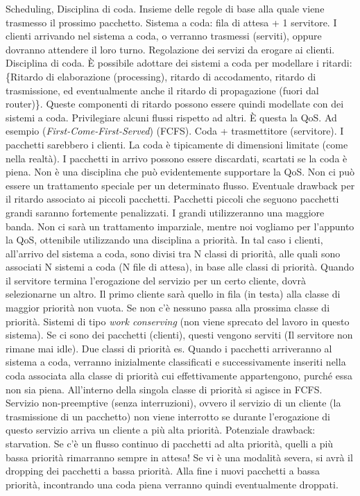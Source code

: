 Scheduling, Disciplina di coda. Insieme delle regole di base alla quale viene trasmesso il prossimo pacchetto. Sistema a coda: fila di attesa + 1 servitore. I clienti arrivando nel sistema a coda, o verranno trasmessi (serviti), oppure dovranno attendere il loro turno. Regolazione dei servizi da erogare ai clienti. Disciplina di coda. \`E possibile adottare dei sistemi a coda per modellare i ritardi: \{Ritardo di elaborazione (processing), ritardo di accodamento, ritardo di trasmissione, ed eventualmente anche il ritardo di propagazione (fuori dal router)\}. Queste componenti di ritardo possono essere quindi modellate con dei sistemi a coda. Privilegiare alcuni flussi rispetto ad altri. \`E questa la QoS. Ad esempio (\textit{First-Come-First-Served}) (FCFS). Coda + trasmettitore (servitore). I pacchetti sarebbero i clienti. La coda è tipicamente di dimensioni limitate (come nella realtà). I pacchetti in arrivo possono essere discardati, scartati se la coda è piena. Non è una disciplina che può evidentemente supportare la QoS. Non ci può essere un trattamento speciale per un determinato flusso. Eventuale drawback per il ritardo associato ai piccoli pacchetti. Pacchetti piccoli che seguono pacchetti grandi saranno fortemente penalizzati. I grandi utilizzeranno una maggiore banda. Non ci sarà un trattamento imparziale, mentre noi vogliamo per l'appunto la QoS, ottenibile utilizzando una disciplina a priorità. In tal caso i clienti, all'arrivo del sistema a coda, sono divisi tra N classi di priorità, alle quali sono associati N sistemi a coda (N file di attesa), in base alle classi di priorità. Quando il servitore termina l'erogazione del servizio per un certo cliente, dovrà selezionarne un altro. Il primo cliente sarà quello in fila (in testa) alla classe di maggior priorità non vuota. Se non c'è nessuno passa alla prossima classe di priorità. Sistemi di tipo \textit{work conserving} (non viene sprecato del lavoro in questo sistema). Se ci sono dei pacchetti (clienti), questi vengono serviti (Il servitore non rimane mai idle). Due classi di priorità es. Quando i pacchetti arriveranno al sistema a coda, verranno inizialmente classificati e successivamente inseriti nella coda associata alla classe di priorità cui effettivamente appartengono, purché essa non sia piena. All'interno della singola classe di priorità si agisce in FCFS. Servizio non-preemptive (senza interruzioni), ovvero il servizio di un cliente (la trasmissione di un pacchetto) non viene interrotto se durante l'erogazione di questo servizio arriva un cliente a più alta priorità. Potenziale drawback: starvation. Se c'è un flusso continuo di pacchetti ad alta priorità, quelli a più bassa priorità rimarranno sempre in attesa! Se vi è una modalità severa, si avrà il dropping dei pacchetti a bassa priorità. Alla fine i nuovi pacchetti a bassa priorità, incontrando una coda piena verranno quindi eventualmente droppati.

